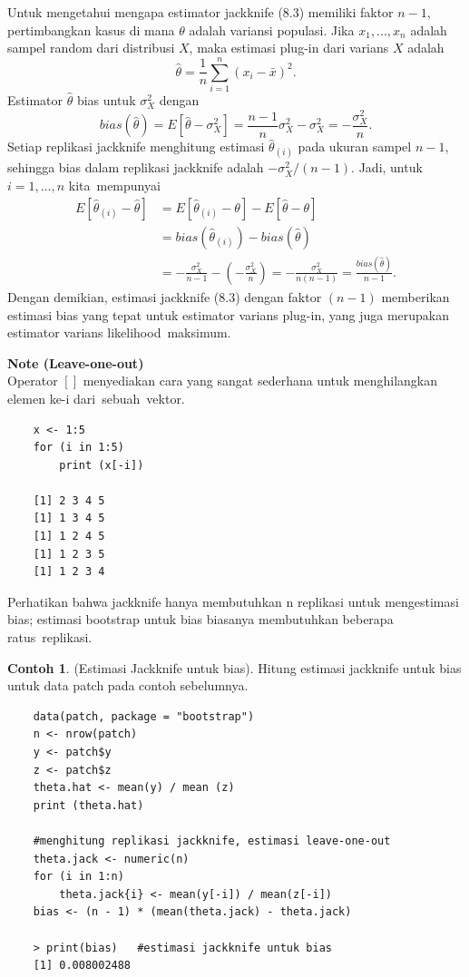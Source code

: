 \documentclass[a4paper,12pt]{article}
\theoremstyle{definition}
\newtheorem{example}{Contoh}[section]
\begin{document}
Untuk mengetahui mengapa estimator jackknife (8.3) memiliki faktor $n-1$, pertimbangkan kasus di mana $\theta$ adalah variansi populasi. Jika $x_{1}, ..., x_{n}$ adalah sampel random dari distribusi $X$, maka estimasi plug-in dari varians $X$ adalah
\begin{equation*}
\hat{\theta} = \frac{1}{n}\sum_{i=1}^{n}(x_{i}-\bar{x})^{2}.
\end{equation*}
Estimator $\hat{\theta}$ bias untuk $\sigma^{2}_{X}$ dengan
\begin{equation*}
bias(\hat{\theta}) = E[\hat{\theta}-\sigma^{2}_{X}] = \frac{n-1}{n}\sigma^{2}_{X}-\sigma^{2}_{X} = -\frac{\sigma^{2}_{X}}{n}.
\end{equation*}
Setiap replikasi jackknife menghitung estimasi $\hat{\theta}_{(i)}$ pada ukuran sampel $n-1$, sehingga bias dalam replikasi jackknife adalah $-\sigma^{2}_{X}/(n-1)$. Jadi, untuk $i = 1, ...,n$ kita mempunyai
\begin{equation*}
    \begin{split}
        E[\hat{\theta}_{(i)}-\hat{\theta}] &=E[\hat{\theta}_{(i)}-\theta]-E[\hat{\theta}-\theta]\\
        &=bias(\hat{\theta}_{(i)})-bias(\hat{\theta})\\
        &=-\frac{\sigma^{2}_{X}}{n-1}-\left(-\frac{\sigma^{2}_{X}}{n}\right) = -\frac{\sigma^{2}_{X}}{n(n-1)} = \frac{bias(\hat{\theta})}{n-1}.
    \end{split}
\end{equation*}
Dengan demikian, estimasi jackknife (8.3) dengan faktor $(n-1)$ memberikan estimasi bias yang tepat untuk estimator varians plug-in, yang juga merupakan estimator varians likelihood maksimum.


\textbf{Note (Leave-one-out)}\\
Operator $\left [  \right ]$ menyediakan cara yang sangat sederhana untuk menghilangkan elemen ke-i dari sebuah vektor.
\begin{lstlisting}
    x <- 1:5
    for (i in 1:5)
        print (x[-i])

    [1] 2 3 4 5
    [1] 1 3 4 5
    [1] 1 2 4 5
    [1] 1 2 3 5
    [1] 1 2 3 4
\end{lstlisting}
Perhatikan bahwa jackknife hanya membutuhkan n replikasi untuk mengestimasi bias; estimasi bootstrap untuk bias biasanya membutuhkan beberapa ratus replikasi.

\begin{example}(Estimasi Jackknife untuk bias).
Hitung estimasi jackknife untuk bias untuk data patch pada contoh sebelumnya.
\begin{lstlisting}
    data(patch, package = "bootstrap")
    n <- nrow(patch)
    y <- patch$y
    z <- patch$z
    theta.hat <- mean(y) / mean (z)
    print (theta.hat)

    #menghitung replikasi jackknife, estimasi leave-one-out
    theta.jack <- numeric(n)
    for (i in 1:n)
        theta.jack{i} <- mean(y[-i]) / mean(z[-i])
    bias <- (n - 1) * (mean(theta.jack) - theta.jack)

    > print(bias)   #estimasi jackknife untuk bias
    [1] 0.008002488
\end{lstlisting}
\end{example}
\end{document}

